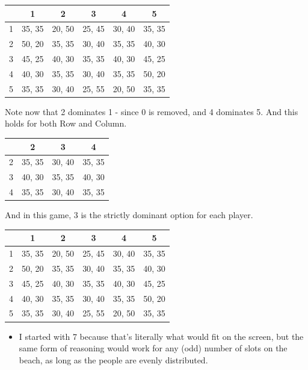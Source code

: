 \documentclass[
  14pt,
  letterpaper,
  ignorenonframetext,
  aspectratio=169,
  handout]{beamer}
\providecommand{\tightlist}{%
  \setlength{\itemsep}{0pt}\setlength{\parskip}{0pt}}\usepackage{longtable,booktabs,array}
\let\olditem\item
\renewcommand{\item}{%
\olditem\vspace{6pt}}
\begin{document}
\begin{frame}[plain]{}
\protect\hypertarget{section-6}{}
\begin{table}[!h]
\centering
\begin{tabular}[t]{>{}r|ccccc}
\toprule
 & 1 & 2 & 3 & 4 & 5\\
\midrule
1 & 35, 35 & 20, 50 & 25, 45 & 30, 40 & 35, 35\\
2 & 50, 20 & 35, 35 & 30, 40 & 35, 35 & 40, 30\\
3 & 45, 25 & 40, 30 & 35, 35 & 40, 30 & 45, 25\\
4 & 40, 30 & 35, 35 & 30, 40 & 35, 35 & 50, 20\\
5 & 35, 35 & 30, 40 & 25, 55 & 20, 50 & 35, 35\\
\bottomrule
\end{tabular}
\end{table}

Note now that 2 dominates 1 - since 0 is removed, and 4 dominates 5. And
this holds for both Row and Column.
\end{frame}

\begin{frame}[plain]{}
\protect\hypertarget{section-7}{}
\begin{table}[!h]
\centering
\begin{tabular}[t]{>{}r|ccc}
\toprule
 & 2 & 3 & 4\\
\midrule
2 & 35, 35 & 30, 40 & 35, 35\\
3 & 40, 30 & 35, 35 & 40, 30\\
4 & 35, 35 & 30, 40 & 35, 35\\
\bottomrule
\end{tabular}
\end{table}

And in this game, 3 is the strictly dominant option for each player.
\end{frame}

\begin{frame}[plain]{}
\protect\hypertarget{section-8}{}
\begin{table}[!h]
\centering
\begin{tabular}[t]{>{}r|ccccc}
\toprule
 & 1 & 2 & 3 & 4 & 5\\
\midrule
1 & 35, 35 & 20, 50 & 25, 45 & 30, 40 & 35, 35\\
2 & 50, 20 & 35, 35 & 30, 40 & 35, 35 & 40, 30\\
3 & 45, 25 & 40, 30 & 35, 35 & 40, 30 & 45, 25\\
4 & 40, 30 & 35, 35 & 30, 40 & 35, 35 & 50, 20\\
5 & 35, 35 & 30, 40 & 25, 55 & 20, 50 & 35, 35\\
\bottomrule
\end{tabular}
\end{table}

\begin{itemize}[<+->]
\tightlist
\item
  I started with 7 because that's literally what would fit on the
  screen, but the same form of reasoning would work for any (odd) number
  of slots on the beach, as long as the people are evenly distributed.
\end{itemize}
\end{frame}
\end{document}
